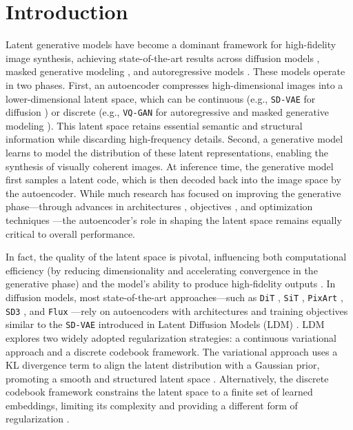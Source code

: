 \section{Introduction}
\label{sec:intro}




Latent generative models \cite{rombach2022high} have become a dominant framework for high-fidelity image synthesis, achieving state-of-the-art results across diffusion models \cite{rombach2022high, yao2024fasterdit, ma2024sit}, masked generative modeling \cite{chang2022maskgit, li2023mage}, and autoregressive models \cite{esser2021taming, li2024autoregressive, tian2024visual}. These models operate in two phases. First, an autoencoder compresses high-dimensional images into a lower-dimensional latent space, which can be continuous (e.g., \texttt{SD-VAE} for diffusion \cite{rombach2022high}) or discrete (e.g., \texttt{VQ-GAN} for autoregressive \cite{esser2021taming, yu2022scaling} and masked generative modeling \cite{chang2022maskgit}). This latent space retains essential semantic and structural information while discarding high-frequency details. Second, a generative model learns to model the distribution of these latent representations, enabling the synthesis of visually coherent images. At inference time, the generative model first samples a latent code, which is then decoded back into the image space by the autoencoder. While much research has focused on improving the generative phase—through advances in architectures \cite{peebles2023scalable}, objectives \cite{ma2024sit}, and optimization techniques \cite{yao2024fasterdit}—the autoencoder's role in shaping the latent space remains equally critical to overall performance.

In fact, the quality of the latent space is pivotal, influencing both computational efficiency (by reducing dimensionality and accelerating convergence in the generative phase) and the model's ability to produce high-fidelity outputs \cite{rombach2022high}. %
In diffusion models, most state-of-the-art approaches—such as \texttt{DiT} \cite{peebles2023scalable}, \texttt{SiT} \cite{ma2024sit}, \texttt{PixArt} \cite{chen2024pixartalpha}, \texttt{SD3} \cite{esser2024sd3}, and \texttt{Flux} \cite{flux2023}—rely on autoencoders with architectures and training objectives similar to the \texttt{SD-VAE} introduced in Latent Diffusion Models (LDM) \cite{rombach2022high}. LDM explores two widely adopted regularization strategies: a continuous variational approach and a discrete codebook framework. The variational approach uses a KL divergence term to align the latent distribution with a Gaussian prior, promoting a smooth and structured latent space \cite{kingma2014}. Alternatively, the discrete codebook framework constrains the latent space to a finite set of learned embeddings, limiting its complexity and providing a different form of regularization \cite{esser2021taming}.


